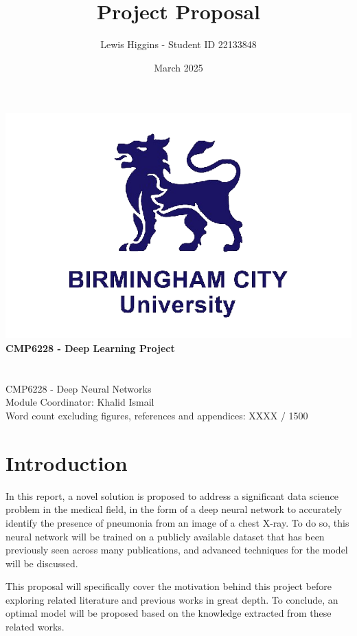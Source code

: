 \documentclass[12pt]{report}
\title{Project Proposal}
\author{Lewis Higgins - Student ID 22133848}
\date{March 2025}
\newcommand{\para}{\vspace{7pt}\noindent}
\begin{document}
\makeatletter
\begin{titlepage}
    \begin{center}
        \includegraphics[width=0.7\linewidth]{BCU}\\[4ex]
        {\huge \bfseries CMP6228 - Deep Learning Project}\\[2ex]
        {\large \bfseries  \@title}\\[50ex]
        {\@author}\\[2ex]
        {CMP6228 - Deep Neural Networks}\\[2ex]
        {Module Coordinator: Khalid Ismail}\\[2ex]
        {Word count excluding figures, references and appendices: XXXX / 1500}\\[10ex]
    \end{center}
\end{titlepage}
\makeatother
\thispagestyle{empty}
\newpage

\setcounter{page}{0}

\tableofcontents
\thispagestyle{empty}

\chapter*{Introduction}

In this report, a novel solution is proposed to address a significant data science problem in the medical field, in the form of 
a deep neural network to accurately identify the presence of pneumonia from an image of a chest X-ray. To do so, this neural network 
will be trained on a publicly available dataset that has been previously seen across many publications, and advanced techniques 
for the model will be discussed.

\para This proposal will specifically cover the motivation behind this project before exploring related literature and previous works 
in great depth. To conclude, an optimal model will be proposed based on the knowledge extracted from these related works. 
\end{document}
